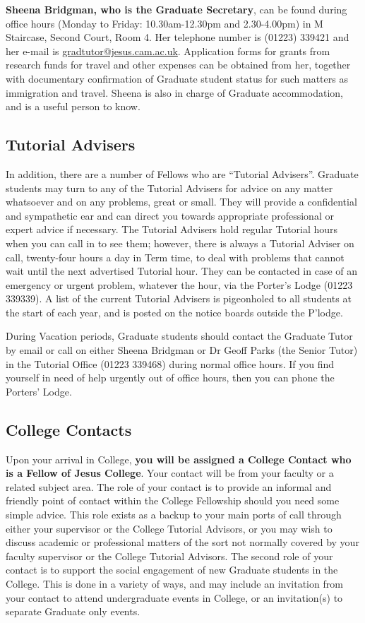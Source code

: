 \documentclass[11pt,fleqn, oneside]{book} %
\begin{document}
\textbf{Sheena Bridgman, who is the Graduate Secretary}, can be found during office hours (Monday to Friday: 10.30am-12.30pm and 2.30-4.00pm) in M Staircase, Second Court, Room 4. Her telephone number is (01223) 339421 and her e-mail is \url{gradtutor@jesus.cam.ac.uk}. Application forms for grants from research funds for travel and other expenses can be obtained from her, together with documentary confirmation of Graduate student status for such matters as immigration and travel. Sheena is also in charge of Graduate accommodation, and is a useful person to know. 

\subsection{Tutorial Advisers}

In addition, there are a number of Fellows who are “Tutorial Advisers”. Graduate students may turn to any of the Tutorial Advisers for advice on any matter whatsoever and on any problems, great or small. They will provide a confidential and sympathetic ear and can direct you towards appropriate professional or expert advice if necessary. The Tutorial Advisers hold regular Tutorial hours when you can call in to see them; however, there is always a Tutorial Adviser on call, twenty-four hours a day in Term time, to deal with problems that cannot wait until the next advertised Tutorial hour. They can be contacted in case of an emergency or urgent problem, whatever the hour, via the Porter’s Lodge (01223 339339).  A list of the current Tutorial Advisers is pigeonholed to all students at the start of each year, and is posted on the notice boards outside the P’lodge. 

During Vacation periods, Graduate students should contact the Graduate Tutor by email or call on either Sheena Bridgman or Dr Geoff Parks (the Senior Tutor) in the Tutorial Office (01223 339468) during normal office hours.  If you find yourself in need of help urgently out of office hours, then you can phone the Porters’ Lodge.

\subsection{College Contacts}
Upon your arrival in College, \textbf{you will be assigned a College Contact who is a Fellow of Jesus College}. Your contact will be from your faculty or a related subject area. The role of your contact is to provide an informal and friendly point of contact within the College Fellowship should you need some simple advice. This role exists as a backup to your main ports of call through either your supervisor or the College Tutorial Advisors, or you may wish to discuss academic or professional matters of the sort not normally covered by your faculty supervisor or the College Tutorial Advisors. The second role of your contact is to support the social engagement of new Graduate students in the College. This is done in a variety of ways, and may include an invitation from your contact to attend undergraduate events in College, or an invitation(s) to separate Graduate only events. 
\end{document}
